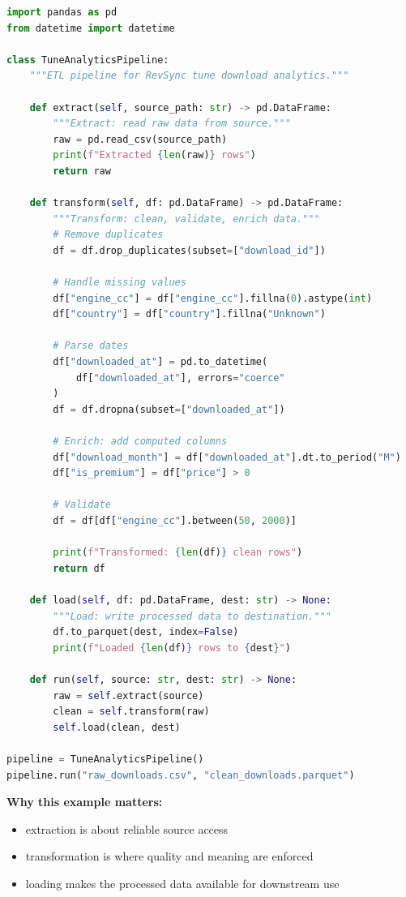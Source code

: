 \documentclass[12pt, a4paper, oneside]{book}
\begin{document}
\begin{lstlisting}[language=Python, caption={ETL pipeline example}]
import pandas as pd
from datetime import datetime

class TuneAnalyticsPipeline:
    """ETL pipeline for RevSync tune download analytics."""

    def extract(self, source_path: str) -> pd.DataFrame:
        """Extract: read raw data from source."""
        raw = pd.read_csv(source_path)
        print(f"Extracted {len(raw)} rows")
        return raw

    def transform(self, df: pd.DataFrame) -> pd.DataFrame:
        """Transform: clean, validate, enrich data."""
        # Remove duplicates
        df = df.drop_duplicates(subset=["download_id"])

        # Handle missing values
        df["engine_cc"] = df["engine_cc"].fillna(0).astype(int)
        df["country"] = df["country"].fillna("Unknown")

        # Parse dates
        df["downloaded_at"] = pd.to_datetime(
            df["downloaded_at"], errors="coerce"
        )
        df = df.dropna(subset=["downloaded_at"])

        # Enrich: add computed columns
        df["download_month"] = df["downloaded_at"].dt.to_period("M")
        df["is_premium"] = df["price"] > 0

        # Validate
        df = df[df["engine_cc"].between(50, 2000)]

        print(f"Transformed: {len(df)} clean rows")
        return df

    def load(self, df: pd.DataFrame, dest: str) -> None:
        """Load: write processed data to destination."""
        df.to_parquet(dest, index=False)
        print(f"Loaded {len(df)} rows to {dest}")

    def run(self, source: str, dest: str) -> None:
        raw = self.extract(source)
        clean = self.transform(raw)
        self.load(clean, dest)

pipeline = TuneAnalyticsPipeline()
pipeline.run("raw_downloads.csv", "clean_downloads.parquet")
\end{lstlisting}

\textbf{Why this example matters:}
\begin{itemize}[leftmargin=2em]
    \item extraction is about reliable source access
    \item transformation is where quality and meaning are enforced
    \item loading makes the processed data available for downstream use
\end{itemize}
\end{document}
